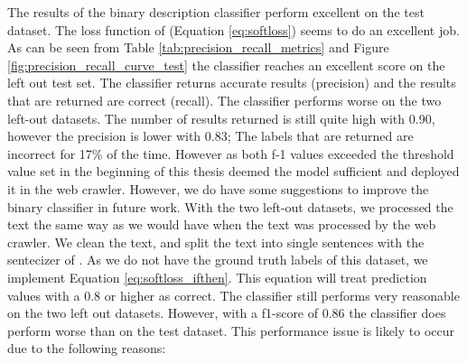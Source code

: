 \documentclass[a4paper, 12pt, oneside]{book} %
\begin{document}
The results of the binary description classifier perform excellent on the test dataset. 
The loss function of \textcite{reed_training_2015} (Equation \ref{eq:softloss}) seems to do an excellent job.
As can be seen from Table \ref{tab:precision_recall_metrics} and Figure \ref{fig:precision_recall_curve_test} the classifier reaches an excellent score on the left out test set. 
The classifier returns accurate results (precision) and the results that are returned are correct (recall). 
The classifier performs worse on the two left-out datasets.
The number of results returned is still quite high with 0.90, however the precision is lower with 0.83; The labels that are returned are incorrect for 17\% of the time.
However as both f-1 values exceeded the threshold value set in the beginning of this thesis deemed the model sufficient and deployed it in the web crawler.
However, we do have some suggestions to improve the binary classifier in future work.
With the two left-out datasets, we processed the text the same way as we would have when the text was processed by the web crawler. 
We clean the text, and split the text into single sentences with the sentecizer of \textcite{honnibal_spacy_2020}.
As we do not have the ground truth labels of this dataset, we implement Equation \ref{eq:softloss_ifthen}.
This equation will treat prediction values with a 0.8 or higher as correct.
The classifier still performs very reasonable on the two left out datasets.
However, with a f1-score of 0.86 the classifier does perform worse than on the test dataset.
This performance issue is likely to occur due to the following reasons:
\end{document}
